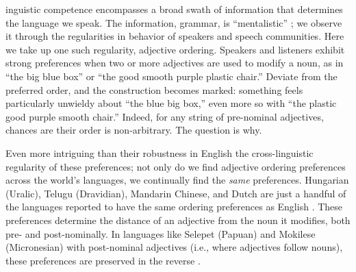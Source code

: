\documentclass{pnastwo}
\begin{document}
\begin{article}
\begin{abstract}
{Abstract here\ldots}
\end{abstract}



inguistic competence encompasses a broad swath of information that determines the language we speak. The information, grammar, is ``mentalistic'' \cite{chomsky1965}; we observe it through the regularities in behavior of speakers and speech communities. Here we take up one such regularity, adjective ordering. Speakers and listeners exhibit strong preferences when two or more adjectives are used to modify a noun, as in ``the big blue box'' or ``the good smooth purple plastic chair.'' Deviate from the preferred order, and the construction becomes marked: something feels particularly unwieldy about ``the blue big box,'' even more so with ``the plastic good purple smooth chair.'' Indeed, for any string of pre-nominal adjectives, chances are their order is non-arbitrary. The question is why.

Even more intriguing than their robustness in English the cross-linguistic regularity of these preferences; not only do we find adjective ordering preferences across the world's languages, we continually find the \emph{same} preferences. Hungarian (Uralic), Telugu (Dravidian), Mandarin Chinese, and Dutch are just a handful of the languages reported to have the same ordering preferences as English \cite{dixon1982,sproatshih1991,martin1969competence,hetzron1978,lapollahuang2004}. These preferences determine the distance of an adjective from the noun it modifies, both pre- and post-nominally. In languages like Selepet (Papuan) and Mokilese (Micronesian) with post-nominal adjectives (i.e., where adjectives follow nouns), these preferences are preserved in the reverse \cite{dixon1982,sproatshih1991}. 


\end{article}
\end{document}
